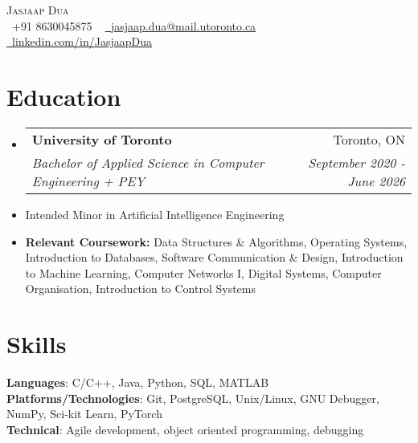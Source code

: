 \documentclass[letterpaper,11pt]{article}
\makeatletter
\newcommand{\resumeItem}[1]{
  \item\small{
    {#1 \vspace{-2pt}}
  }
}
\newcommand{\resumeSubheading}[4]{
  \vspace{-2pt}\item
    \begin{tabular*}{0.97\textwidth}[t]{l@{\extracolsep{\fill}}r}
      \textbf{#1} & #2 \\
      \textit{\small#3} & \textit{\small #4} \\
    \end{tabular*}\vspace{-7pt}
}
\newcommand{\resumeSubItem}[1]{\resumeItem{#1}\vspace{-4pt}}
\newcommand{\resumeSubHeadingListStart}{\begin{itemize}[leftmargin=0.15in, label={}]}
\newcommand{\resumeSubHeadingListEnd}{\end{itemize}}
\makeatother
\begin{document}

\begin{center}
    {\Huge \scshape Jasjaap Dua} \\
    \vspace{1pt}
    \small \raisebox{-0.1\height}\faPhone\ +91 8630045875 ~ \href{mailto:jasjaap.dua@mail.utoronto.ca}{\raisebox{-0.2\height}\faEnvelope\  \underline{jasjaap.dua@mail.utoronto.ca}} ~ 
    \href{https://linkedin.com/in/JasjaapDua}{\raisebox{-0.2\height}\faLinkedin\ \underline{linkedin.com/in/JasjaapDua}}
    \vspace{-8pt}
\end{center}

\vspace{0.001cm}

\section{Education}
      \resumeSubHeadingListStart
        \resumeSubheading
          {University of Toronto}{Toronto, ON}
          {Bachelor of Applied Science in Computer Engineering + PEY}{September 2020 - June 2026}
        \resumeSubItem{Intended Minor in Artificial Intelligence Engineering}
        \resumeSubItem{\textbf{Relevant Coursework: }Data Structures \& Algorithms, Operating Systems, Introduction to Databases, Software Communication \& Design, Introduction to Machine Learning, Computer Networks I, Digital Systems, Computer Organisation, Introduction to Control Systems}
      \resumeSubHeadingListEnd
  
\section{Skills}
 \begin{itemize}[leftmargin=0.15in, label={}]
    \small{\item{
     \textbf{Languages}{: C/C++, Java, Python, SQL, MATLAB} \\
     \textbf{Platforms/Technologies}{: Git, PostgreSQL, Unix/Linux, GNU Debugger, NumPy, Sci-kit Learn, PyTorch} \\
     \textbf{Technical}{: Agile development, object oriented programming, debugging}
    }}
 \end{itemize}
\end{document}
